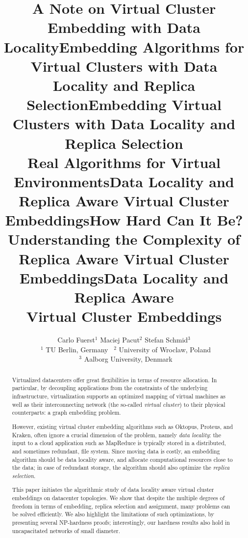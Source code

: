 \documentclass[preprint,12pt]{elsarticle}
\title{A Note on Virtual Cluster Embedding with Data Locality}
\title{Embedding Algorithms for Virtual Clusters with Data Locality and Replica Selection}
\title{Embedding Virtual Clusters with Data Locality and Replica Selection\\{\Large Real Algorithms for Virtual Environments}}
\title{Data Locality and Replica Aware Virtual Cluster Embeddings}
\title{How Hard Can It Be?\\{\Large Understanding the Complexity of  
Replica Aware Virtual Cluster Embeddings}}
\begin{document}
\begin{frontmatter}

\title{Data Locality and Replica Aware\\Virtual Cluster Embeddings}


\author{Carlo Fuerst$^{1}$ \quad Maciej Pacut$^{2}$ \quad Stefan Schmid$^3$\\
{\small~$^1$ TU Berlin, Germany \quad~$^2$ University of Wroclaw, Poland \\~$^3$ 
Aalborg University, Denmark}}


\begin{abstract}
Virtualized datacenters offer great flexibilities in terms of resource allocation. In particular, by
decoupling applications from the constraints of the underlying infrastructure, virtualization
supports an optimized mapping of virtual machines as well as their interconnecting network
 (the so-called \emph{virtual cluster})
to their
physical counterparts: a graph embedding problem.

However, existing virtual cluster embedding algorithms such as Oktopus,
Proteus, and Kraken,
often ignore a crucial dimension of the problem, namely \emph{data locality}:
the input to a cloud application such as MapReduce is typically stored in a distributed,
and sometimes redundant, file system. Since moving
data is costly, an embedding algorithm should be data locality aware,
and allocate computational resources close to the data; in case of redundant storage, the algorithm should also optimize the \emph{replica selection}.

This paper initiates the algorithmic study of data locality aware virtual cluster embeddings
on datacenter topologies.
We
show that
despite the multiple degrees of freedom in terms of embedding, replica selection and assignment,
many problems can be
solved efficiently. We also highlight the limitations of such optimizations,
by presenting several NP-hardness proofs; interestingly,
our hardness results also hold in uncapacitated networks of small diameter.
\end{abstract}

\end{frontmatter}

\sloppy

\end{document}
